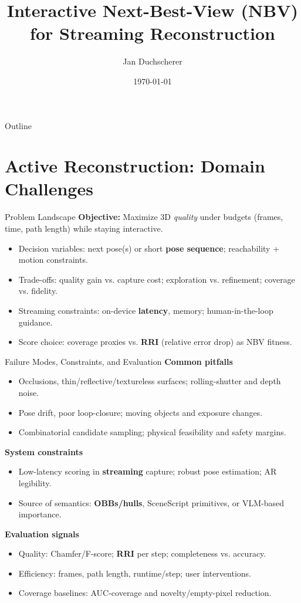 \documentclass[10pt,aspectratio=169]{beamer}
\title{Interactive Next-Best-View (NBV) for Streaming Reconstruction}
\author{Jan Duchscherer}
\institute{%
  Hauptseminar \\[0.5ex]
  Department of Computer Science and Mathematics\\[1ex]
  Lecturer: Prof.\ Dr.\ Markus Friedrich
}
\date{\today}
\begin{document}
\begin{frame}[plain]
  \titlepage
\end{frame}

\begin{frame}{Outline}
\tableofcontents
\end{frame}

\section{Active Reconstruction: Domain Challenges}

\begin{frame}{Problem Landscape}
\textbf{Objective:} Maximize 3D \emph{quality} under budgets (frames, time, path length) while staying interactive.
\begin{itemize}
  \item Decision variables: next pose(s) or short \textbf{pose sequence}; reachability + motion constraints.
  \item Trade-offs: quality gain vs. capture cost; exploration vs. refinement; coverage vs. fidelity.
  \item Streaming constraints: on-device \textbf{latency}, memory; human-in-the-loop guidance.
  \item Score choice: coverage proxies vs. \textbf{RRI} (relative error drop) as NBV fitness.
\end{itemize}
\end{frame}

\begin{frame}{Failure Modes, Constraints, and Evaluation}
\textbf{Common pitfalls}
\begin{itemize}
  \item Occlusions, thin/reflective/textureless surfaces; rolling-shutter and depth noise.
  \item Pose drift, poor loop-closure; moving objects and exposure changes.
  \item Combinatorial candidate sampling; physical feasibility and safety margins.
\end{itemize}
\textbf{System constraints}
\begin{itemize}
  \item Low-latency scoring in \textbf{streaming} capture; robust pose estimation; AR legibility.
  \item Source of semantics: \textbf{OBBs/hulls}, SceneScript primitives, or VLM-based importance.
\end{itemize}
\textbf{Evaluation signals}
\begin{itemize}
  \item Quality: Chamfer/F-score; \textbf{RRI} per step; completeness vs. accuracy.
  \item Efficiency: frames, path length, runtime/step; user interventions.
  \item Coverage baselines: AUC-coverage and novelty/empty-pixel reduction.
\end{itemize}
\end{frame}
\end{document}
